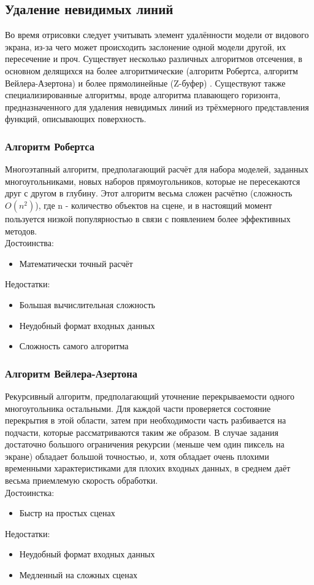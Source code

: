 \documentclass[a4paper,12pt]{report}
\numberwithin{equation}{section}
\begin{document}
\subsection{Удаление невидимых линий}
Во время отрисовки следует учитывать элемент удалённости модели от видового экрана, из-за чего может происходить заслонение одной модели другой, их пересечение и проч. Существует несколько различных алгоритмов отсечения, в основном делящихся на более алгоритмические (алгоритм Робертса, алгоритм Вейлера-Азертона) и более прямолинейные (Z-буфер) \cite{rogerscgelements}. Существуют также специализированные алгоритмы, вроде алгоритма плавающего горизонта, предназначенного для удаления невидимых линий из трёхмерного представления функций, описывающих поверхность.

\subsubsection*{Алгоритм Робертса}
Многоэтапный алгоритм, предполагающий расчёт для набора моделей, заданных многоугольниками, новых наборов прямоугольников, которые не пересекаются друг с другом в глубину. Этот алгоритм весьма сложен расчётно (сложность $O(n^2)$), где n - количество объектов на сцене, и в настоящий момент пользуется низкой популярностью в связи с появлением более эффективных методов. \\
Достоинства:
\begin{itemize}
\item Математически точный расчёт
\end{itemize}
Недостатки:
\begin{itemize}
\item Большая вычислительная сложность
\item Неудобный формат входных данных
\item Сложность самого алгоритма
\end{itemize}

\subsubsection*{Алгоритм Вейлера-Азертона}
Рекурсивный алгоритм, предполагающий уточнение перекрываемости одного многоугольника остальными. Для каждой части проверяется состояние перекрытия в этой области, затем при необходимости часть разбивается на подчасти, которые рассматриваются таким же образом. В случае задания достаточно большого ограничения рекурсии (меньше чем один пиксель на экране) обладает большой точностью, и, хотя обладает очень плохими временными характеристиками для плохих входных данных, в среднем даёт весьма приемлемую скорость обработки. \\
Достоинстка:
\begin{itemize}
\item Быстр на простых сценах
\end{itemize}
Недостатки:
\begin{itemize}
\item Неудобный формат входных данных
\item Медленный на сложных сценах
\end{itemize}
\end{document}
